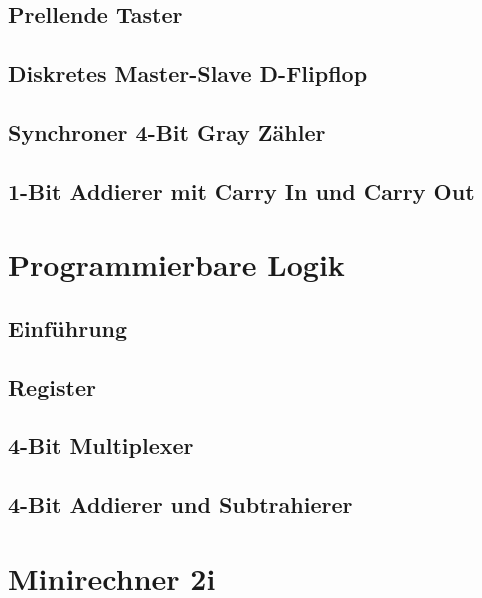 \documentclass[paper=a4, fontsize=11pt]{scrartcl}
\numberwithin{equation}{section}
\numberwithin{figure}{section}
\numberwithin{table}{section}
\begin{document}
\subsection{Prellende Taster}

\subsection{Diskretes Master-Slave D-Flipflop}

\subsection{Synchroner 4-Bit Gray Zähler}

\subsection{1-Bit Addierer mit Carry In und Carry Out}


\newpage

\section{Programmierbare Logik}

\subsection{Einführung}

\subsection{Register}

\subsection{4-Bit Multiplexer}

\subsection{4-Bit Addierer und Subtrahierer}


\newpage

\section{Minirechner 2i}
\end{document}

